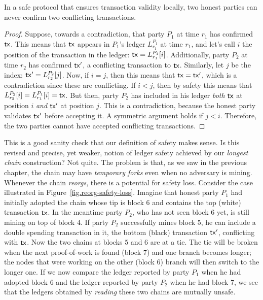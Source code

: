 \begin{lemma}
In a safe protocol that ensures transaction validity locally,
two honest parties can never confirm two conflicting transactions.
\end{lemma}
\begin{proof}
Suppose, towards a contradiction, that party $P_1$ at time $r_1$ has confirmed $\mathsf{tx}$. This means that $\mathsf{tx}$ appears in $P_1$'s
ledger $L^{P_1}_{r_1}$ at time $r_1$, and let's call $i$ the position of the transaction in the ledger: $\mathsf{tx} = L^{P_1}_{r_1}[i]$.
Additionally, party $P_2$ at time $r_2$ has confirmed $\mathsf{tx}'$, a conflicting transaction to $\mathsf{tx}$. Similarly, let $j$ be the index:
$\mathsf{tx}' = L^{P_2}_{r_2}[j]$. Now, if $i = j$, then this means that $\mathsf{tx} = \mathsf{tx}'$, which is a contradiction since these are conflicting.
If $i < j$, then by safety this means that $L^{P_2}_{r_2}[i] = L^{P_1}_{r_1}[i] = \mathsf{tx}$. But then, party $P_2$ has included
in his ledger \emph{both} $\mathsf{tx}$ at position $i$ \emph{and} $\mathsf{tx}'$ at position $j$. This is a contradiction, because the honest
party validates $\mathsf{tx}'$ before accepting it. A symmetric argument holds if $j < i$.
Therefore, the two parties cannot have accepted conflicting transactions.
\end{proof}

This is a good sanity check that our definition of safety makes sense. Is this revised and precise, yet weaker, notion of ledger
safety achieved by our \emph{longest chain} construction? Not quite. The problem is that, as we saw in the previous chapter,
the chain may have \emph{temporary forks} even when no adversary is mining. Whenever the chain \emph{reorgs}, there is a
potential for safety loss. Consider the case illustrated in Figure~\ref{fig.reorg-safety-loss}. Imagine that honest party
$P_1$ had initially adopted the chain whose tip is block $6$ and contains the top (white) transaction $\mathsf{tx}$. In the meantime
party $P_2$, who has not seen block $6$ yet, is still mining on top of block $4$. If party $P_2$ successfully mines block
$5$, he can include a double spending transaction in it, the bottom (black) transaction $\mathsf{tx}'$, conflicting with $\mathsf{tx}$.
Now the two chains at blocks $5$ and $6$ are at a tie. The tie will be broken when the next proof-of-work
is found (block $7$) and one branch becomes longer; the nodes that were working on the other
(block $6$) branch will then switch to the longer one. If we now compare the ledger reported by party $P_1$ when he
had adopted block $6$ and the ledger reported by party $P_2$ when he had block $7$, we see that the
ledgers obtained by \emph{reading} these two chains are mutually unsafe.

